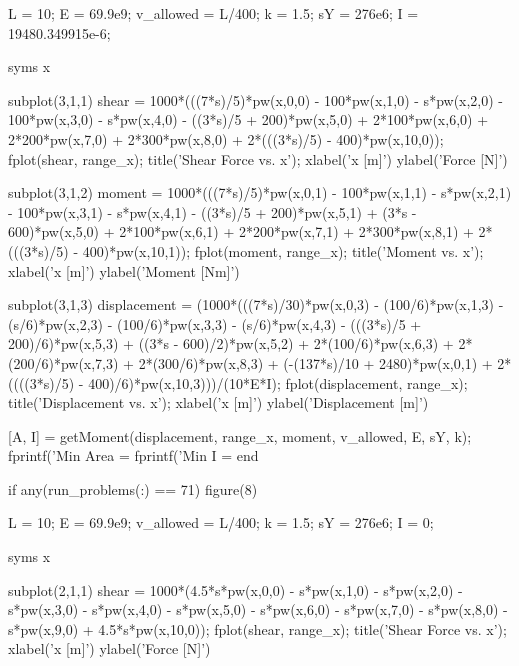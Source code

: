\documentclass[a4paper]{article}
\begin{document}
\begin{verbatim*}
    L = 10; %
    E = 69.9e9; %
    v_allowed = L/400; %
    k = 1.5; %
    sY = 276e6; %
    I = 19480.349915e-6;

    syms x

    subplot(3,1,1)
    shear = 1000*(((7*s)/5)*pw(x,0,0) - 100*pw(x,1,0) - s*pw(x,2,0) - 100*pw(x,3,0) - s*pw(x,4,0) - ((3*s)/5 + 200)*pw(x,5,0) + 2*100*pw(x,6,0) + 2*200*pw(x,7,0) + 2*300*pw(x,8,0) + 2*(((3*s)/5) - 400)*pw(x,10,0));
    fplot(shear, range_x);
    title('Shear Force vs. x');
    xlabel('x [m]')
    ylabel('Force [N]')

    subplot(3,1,2)
    moment = 1000*(((7*s)/5)*pw(x,0,1) - 100*pw(x,1,1) - s*pw(x,2,1) - 100*pw(x,3,1) - s*pw(x,4,1) - ((3*s)/5 + 200)*pw(x,5,1) + (3*s - 600)*pw(x,5,0) + 2*100*pw(x,6,1) + 2*200*pw(x,7,1) + 2*300*pw(x,8,1) + 2*(((3*s)/5) - 400)*pw(x,10,1));
    fplot(moment, range_x);
    title('Moment vs. x');
    xlabel('x [m]')
    ylabel('Moment [Nm]')
    
    subplot(3,1,3)
    displacement = (1000*(((7*s)/30)*pw(x,0,3) - (100/6)*pw(x,1,3) - (s/6)*pw(x,2,3) - (100/6)*pw(x,3,3) - (s/6)*pw(x,4,3) - (((3*s)/5 + 200)/6)*pw(x,5,3) + ((3*s - 600)/2)*pw(x,5,2) + 2*(100/6)*pw(x,6,3) + 2*(200/6)*pw(x,7,3) + 2*(300/6)*pw(x,8,3) + (-(137*s)/10 + 2480)*pw(x,0,1) + 2*((((3*s)/5) - 400)/6)*pw(x,10,3)))/(10*E*I);
    fplot(displacement, range_x);
    title('Displacement vs. x');
    xlabel('x [m]')
    ylabel('Displacement [m]')

    [A, I] = getMoment(displacement, range_x, moment, v_allowed, E, sY, k);
    fprintf('Min Area = %
    fprintf('Min I = %
end


if any(run_problems(:) == 71)
    figure(8)

    L = 10; %
    E = 69.9e9; %
    v_allowed = L/400; %
    k = 1.5; %
    sY = 276e6; %
    I = 0; %

    syms x

    subplot(2,1,1)
    shear = 1000*(4.5*s*pw(x,0,0) - s*pw(x,1,0) - s*pw(x,2,0) - s*pw(x,3,0) - s*pw(x,4,0) - s*pw(x,5,0) - s*pw(x,6,0) - s*pw(x,7,0) - s*pw(x,8,0) - s*pw(x,9,0) + 4.5*s*pw(x,10,0));
    fplot(shear, range_x);
    title('Shear Force vs. x');
    xlabel('x [m]')
    ylabel('Force [N]')


\end{verbatim*}
\end{document}
